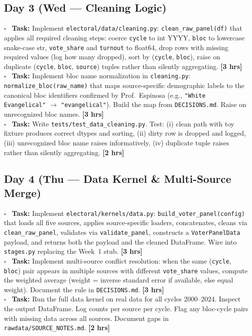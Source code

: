 \documentclass[11pt]{article}
\newcommand{\hrs}[1]{\textbf{[#1 hrs]}}
\newcommand{\dayhead}[2]{%
  \subsection*{Day #1 \normalfont\small\color{codegray}(#2)}}
\newcommand{\task}[2]{%
  \noindent\textbf{Task:} #1 \hfill \hrs{#2}\\}
\newcommand{\done}{\textcolor{sectionblue}{$\square$}\ }
\begin{document}
\dayhead{3}{Wed --- Cleaning Logic}

\begin{taskbox}
\done \task{Implement \texttt{electoral/data/cleaning.py}: \texttt{clean\_raw\_panel(df)}
  that applies all required cleaning steps: coerce \texttt{cycle} to int YYYY,
  \texttt{bloc} to lowercase snake-case str, \texttt{vote\_share} and \texttt{turnout}
  to float64, drop rows with missing required values (log how many dropped),
  sort by (\texttt{cycle}, \texttt{bloc}), raise on duplicate
  (\texttt{cycle}, \texttt{bloc}, \texttt{source}) tuples rather than silently
  aggregating.}{3}

\done \task{Implement bloc name normalization in \texttt{cleaning.py}:
  \texttt{normalize\_bloc(raw\_name)} that maps source-specific demographic
  labels to the canonical bloc identifiers confirmed by Prof.\ Espinosa
  (e.g., \texttt{"White Evangelical"} $\to$ \texttt{"evangelical"}). Build the
  map from \texttt{DECISIONS.md}. Raise on unrecognized bloc names.}{3}

\done \task{Write \texttt{tests/test\_data\_cleaning.py}. Test: (i) clean path
  with toy fixture produces correct dtypes and sorting, (ii) dirty row is
  dropped and logged, (iii) unrecognized bloc name raises informatively,
  (iv) duplicate tuple raises rather than silently aggregating.}{2}
\end{taskbox}

\dayhead{4}{Thu --- Data Kernel \& Multi-Source Merge}

\begin{taskbox}
\done \task{Implement \texttt{electoral/kernels/data.py}: \texttt{build\_voter\_panel(config)}
  that loads all five sources, applies source-specific loaders, concatenates,
  cleans via \texttt{clean\_raw\_panel}, validates via \texttt{validate\_panel},
  constructs a \texttt{VoterPanelData} payload, and returns both the payload and
  the cleaned DataFrame. Wire into \texttt{stages.py} replacing the Week~1 stub.}{3}

\done \task{Implement multi-source conflict resolution: when the same
  (\texttt{cycle}, \texttt{bloc}) pair appears in multiple sources with different
  \texttt{vote\_share} values, compute the weighted average (weight = inverse
  standard error if available, else equal weight). Document the rule in
  \texttt{DECISIONS.md}.}{3}

\done \task{Run the full data kernel on real data for all cycles 2000--2024.
  Inspect the output DataFrame. Log counts per source per cycle. Flag any
  bloc-cycle pairs with missing data across all sources. Document gaps in
  \texttt{rawdata/SOURCE\_NOTES.md}.}{2}
\end{taskbox}
\end{document}
